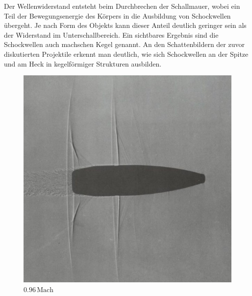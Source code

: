 Der Wellenwiderstand entsteht beim Durchbrechen 
der Schallmauer, wobei ein Teil der Bewegungsenergie 
des Körpers in die Ausbildung von Schockwellen übergeht.
Je nach Form des Objekts kann dieser Anteil deutlich 
geringer sein als der Widerstand im Unterschallbereich.
Ein sichtbares Ergebnis sind die Schockwellen auch machschen Kegel genannt.
An den Schattenbildern der zuvor diskutierten Projektile 
erkennt man deutlich,
wie sich Schockwellen an der Spitze und am Heck 
in kegelförmiger Strukturen ausbilden.
\begin{figure}
    \centering
    \begin{minipage}[b]{0.32\textwidth}
        \centering
        \includegraphics[width=\linewidth]{papers/ueberschall/figures/0.96_mach_projektil.jpg}
        \caption*{$0.96\,\mathrm{Mach}$}
    \end{minipage}
    \hfill
    \begin{minipage}[b]{0.32\textwidth}
        \centering

\end{minipage}
\end{figure}
